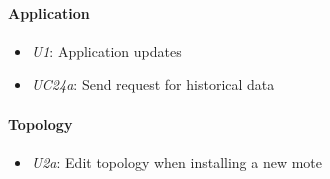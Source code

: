 \documentclass[english]{sareport}
\begin{document}
\paragraph{Application}
\begin{itemize}
	\item \emph{U1}: Application updates
	\item \emph{UC24a}: Send request for historical data
\end{itemize}

\paragraph{Topology}
\begin{itemize}
	\item \emph{U2a}: Edit topology when installing a new mote
\end{itemize}
\end{document}
